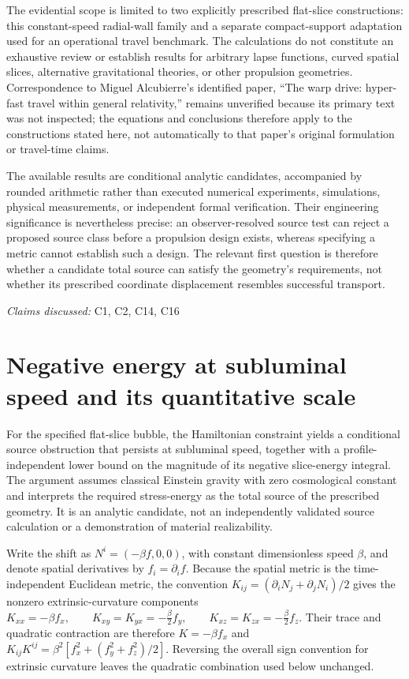 \documentclass[11pt]{article}
\begin{document}
The evidential scope is limited to two explicitly prescribed flat-slice constructions: this constant-speed radial-wall family and a separate compact-support adaptation used for an operational travel benchmark. The calculations do not constitute an exhaustive review or establish results for arbitrary lapse functions, curved spatial slices, alternative gravitational theories, or other propulsion geometries. Correspondence to Miguel Alcubierre’s identified paper, “The warp drive: hyper-fast travel within general relativity,” remains unverified because its primary text was not inspected; the equations and conclusions therefore apply to the constructions stated here, not automatically to that paper’s original formulation or travel-time claims.

The available results are conditional analytic candidates, accompanied by rounded arithmetic rather than executed numerical experiments, simulations, physical measurements, or independent formal verification. Their engineering significance is nevertheless precise: an observer-resolved source test can reject a proposed source class before a propulsion design exists, whereas specifying a metric cannot establish such a design. The relevant first question is therefore whether a candidate total source can satisfy the geometry’s requirements, not whether its prescribed coordinate displacement resembles successful transport.

\textit{Claims discussed: }C1, C2, C14, C16
\section{Negative energy at subluminal speed and its quantitative scale}
For the specified flat-slice bubble, the Hamiltonian constraint yields a conditional source obstruction that persists at subluminal speed, together with a profile-independent lower bound on the magnitude of its negative slice-energy integral. The argument assumes classical Einstein gravity with zero cosmological constant and interprets the required stress-energy as the total source of the prescribed geometry. It is an analytic candidate, not an independently validated source calculation or a demonstration of material realizability.

Write the shift as $N^i=(-\beta f,0,0)$, with constant dimensionless speed $\beta$, and denote spatial derivatives by $f_i=\partial_i f$. Because the spatial metric is the time-independent Euclidean metric, the convention $K_{ij}=(\partial_iN_j+\partial_jN_i)/2$ gives the nonzero extrinsic-curvature components
$K_{xx}=-\beta f_x,\qquad K_{xy}=K_{yx}=-\frac{\beta}{2}f_y,\qquad K_{xz}=K_{zx}=-\frac{\beta}{2}f_z.$
Their trace and quadratic contraction are therefore $K=-\beta f_x$ and $K_{ij}K^{ij}=\beta^2[f_x^2+(f_y^2+f_z^2)/2]$. Reversing the overall sign convention for extrinsic curvature leaves the quadratic combination used below unchanged.
\end{document}
